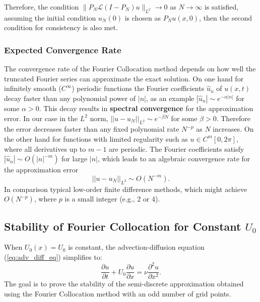 Therefore, the condition $\|P_N \mathcal{L}(I - P_N)u\|_{L^2} \rightarrow 0$ as $N \rightarrow \infty$ is satisfied, assuming the initial condition $u_N(0)$ is chosen as $P_N u(x,0)$, then the second condition for consistency is also met.

\subsubsection{Expected Convergence Rate}
The convergence rate of the Fourier Collocation method depends on how well the truncated Fourier series can approximate the exact solution.
On one hand for infinitely smooth ($C^\infty$) periodic functions the Fourier coefficients $\hat{u}_n$ of $u(x,t)$ decay faster than any polynomial power of $|n|$, as an example  $|\hat{u}_n| \sim e^{-\alpha|n|}$ for some $\alpha > 0$. This decay results in \textbf{spectral convergence} for the approximation error. In our case in the $L^2$ norm, $||u - u_N||_{L^2} \sim e^{-\beta N}$ for some $\beta > 0$. Therefore the error decreases faster than any fixed polynomial rate $N^{-p}$ as $N$ increases.\newline
\newline
On the other hand for functions with limited regularity such as $u \in C^m[0,2\pi]$, where all derivatives up to $m-1$ are periodic. The Fourier coefficients satisfy $|\hat{u}_n| \sim O(|n|^{-m})$ for large $|n|$, which leads  to an algebraic convergence rate for the approximation error
\begin{equation}
	||u - u_N||_{L^2} \sim O(N^{-m}).
	\label{eq:mmm}
\end{equation}
%
In comparison typical low-order finite difference methods, which might achieve $O(N^{-p})$, where  $p$ is a small integer (e.g., 2 or 4).



\subsection{Stability of Fourier Collocation for Constant $U_0$}\label{sub:stability_constant_u0}

When $U_0(x) = U_0$ is constant, the advection-diffusion equation (\ref{eq:adv_diff_eq}) simplifies to:
\begin{equation}
	\frac{\partial u}{\partial t} + U_0 \frac{\partial u}{\partial x} = \nu \frac{\partial^2 u}{\partial x^2}.
	\label{eq:adv_diff_const_U0}
\end{equation}
The goal is to prove the stability of the semi-discrete approximation obtained using the Fourier Collocation method with an odd number of grid points.

